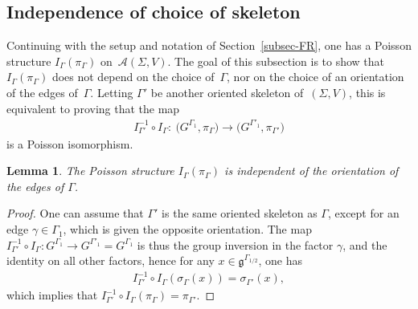 \documentclass[pdftex]{sigma}
\numberwithin{equation}{section}
\newtheorem{Lemma}[Theorem]{Lemma}
\def \g {\mathfrak{a}}
\def \g {\mathfrak{g}}
\def \A {{\mathcal{A}}}
\def \sGam {{\scriptscriptstyle \Gamma}}
\begin{document}
\subsection{Independence of choice of skeleton} \label{subsec-indep}

Continuing with the setup and notation of Section~\ref{subsec-FR}, one has a Poisson structure $I_\Gamma(\pi_{\sGam})$ on~$\A(\Sigma,V)$. The goal of this subsection is to show that $I_\Gamma(\pi_{\sGam})$ does not depend on the choice of~$\Gamma$, nor on the choice of an orientation of the edges of~$\Gamma$. Letting $\Gamma'$ be another oriented skeleton of~$(\Sigma,V)$, this is equivalent to proving that the map
\begin{gather}
I_{\Gamma'}^{-1} \circ I_{\Gamma}\colon \ \big (G^{\Gamma_1}, \pi_{\sGam}\big) \longrightarrow \big(G^{\Gamma'_1}, \pi_{\sGam'}\big) \label{IcircI}
\end{gather}
is a Poisson isomorphism.

\begin{Lemma} \label{lem-orient}
The Poisson structure $I_\Gamma(\pi_{\sGam})$ is independent of the orientation of the edges of $\Gamma$.
\end{Lemma}
\begin{proof}
One can assume that $\Gamma'$ is the same oriented skeleton as $\Gamma$, except for an edge $\gamma \in \Gamma_1$, which is given the opposite orientation. The map $I_{\Gamma'}^{-1} \circ I_{\Gamma}\colon G^{\Gamma_1} \to G^{\Gamma'_1} = G^{\Gamma_1}$ is thus the group inversion in the factor $\gamma$, and the identity on all other factors, hence for any $x \in \g^{\sGam_{1/2}}$, one has
\begin{gather*}
I_{\Gamma'}^{-1} \circ I_{\Gamma}(\sigma_{\sGam}(x)) = \sigma_{\sGam'}(x),
\end{gather*}
which implies that $I_{\Gamma'}^{-1} \circ I_{\Gamma}(\pi_{\sGam}) = \pi_{\sGam'}$.
\end{proof}
\end{document}
